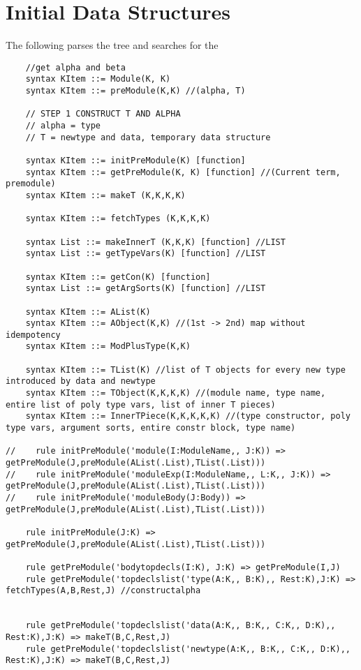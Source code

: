 \section{Initial Data Structures}
The following parses the tree and searches for the 

\begin{lstlisting}
    //get alpha and beta
    syntax KItem ::= Module(K, K)
    syntax KItem ::= preModule(K,K) //(alpha, T)

    // STEP 1 CONSTRUCT T AND ALPHA
    // alpha = type
    // T = newtype and data, temporary data structure

    syntax KItem ::= initPreModule(K) [function]
    syntax KItem ::= getPreModule(K, K) [function] //(Current term, premodule)
    syntax KItem ::= makeT (K,K,K,K)

    syntax KItem ::= fetchTypes (K,K,K,K)

    syntax List ::= makeInnerT (K,K,K) [function] //LIST
    syntax List ::= getTypeVars(K) [function] //LIST

    syntax KItem ::= getCon(K) [function]
    syntax List ::= getArgSorts(K) [function] //LIST

    syntax KItem ::= AList(K)
    syntax KItem ::= AObject(K,K) //(1st -> 2nd) map without idempotency
    syntax KItem ::= ModPlusType(K,K)

    syntax KItem ::= TList(K) //list of T objects for every new type introduced by data and newtype
    syntax KItem ::= TObject(K,K,K,K) //(module name, type name, entire list of poly type vars, list of inner T pieces)
    syntax KItem ::= InnerTPiece(K,K,K,K,K) //(type constructor, poly type vars, argument sorts, entire constr block, type name)

//    rule initPreModule('module(I:ModuleName,, J:K)) => getPreModule(J,preModule(AList(.List),TList(.List)))
//    rule initPreModule('moduleExp(I:ModuleName,, L:K,, J:K)) => getPreModule(J,preModule(AList(.List),TList(.List)))
//    rule initPreModule('moduleBody(J:Body)) => getPreModule(J,preModule(AList(.List),TList(.List)))

    rule initPreModule(J:K) => getPreModule(J,preModule(AList(.List),TList(.List)))

    rule getPreModule('bodytopdecls(I:K), J:K) => getPreModule(I,J)
    rule getPreModule('topdeclslist('type(A:K,, B:K),, Rest:K),J:K) => fetchTypes(A,B,Rest,J) //constructalpha


    rule getPreModule('topdeclslist('data(A:K,, B:K,, C:K,, D:K),, Rest:K),J:K) => makeT(B,C,Rest,J)
    rule getPreModule('topdeclslist('newtype(A:K,, B:K,, C:K,, D:K),, Rest:K),J:K) => makeT(B,C,Rest,J)



\end{lstlisting}

